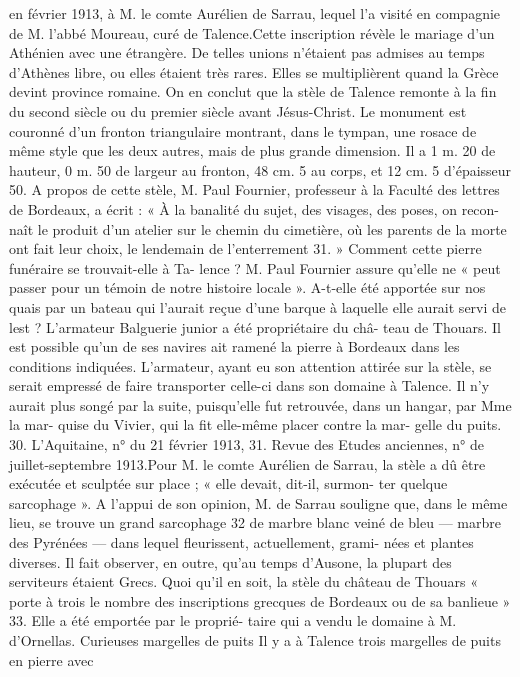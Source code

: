\documentclass[a4paper,11pt]{book}
\begin{document}
en février 1913, à M. le comte Aurélien de Sarrau, lequel l'a visité en
compagnie de M. l'abbé Moureau, curé de Talence.Cette inscription révèle le mariage d'un Athénien avec
une étrangère. De telles unions n'étaient pas admises au
temps d'Athènes libre, ou elles étaient très rares. Elles se
multiplièrent quand la Grèce devint province romaine. On
en conclut que la stèle de Talence remonte à la fin du
second siècle ou du premier siècle avant Jésus-Christ.
Le monument est couronné d'un fronton triangulaire
montrant, dans le tympan, une rosace de même style que
les deux autres, mais de plus grande dimension. Il a
1 m. 20 de hauteur, 0 m. 50 de largeur au fronton, 48 cm. 5
au corps, et 12 cm. 5 d'épaisseur 50.
A propos de cette stèle, M. Paul Fournier, professeur à
la Faculté des lettres de Bordeaux, a écrit :
« À la banalité du sujet, des visages, des poses, on recon-
naît le produit d'un atelier sur le chemin du cimetière, où
les parents de la morte ont fait leur choix, le lendemain
de l'enterrement 31. »
Comment cette pierre funéraire se trouvait-elle à Ta-
lence ? M. Paul Fournier assure qu'elle ne « peut passer
pour un témoin de notre histoire locale ». A-t-elle été
apportée sur nos quais par un bateau qui l'aurait reçue
d'une barque à laquelle elle aurait servi de lest ?
L'armateur Balguerie junior a été propriétaire du châ-
teau de Thouars. Il est possible qu'un de ses navires ait
ramené la pierre à Bordeaux dans les conditions indiquées.
L'armateur, ayant eu son attention attirée sur la stèle,
se serait empressé de faire transporter celle-ci dans son
domaine à Talence. Il n'y aurait plus songé par la suite,
puisqu'elle fut retrouvée, dans un hangar, par Mme la mar-
quise du Vivier, qui la fit elle-même placer contre la mar-
gelle du puits.
30. L'Aquitaine, n° du 21 février 1913,
31. Revue des Etudes anciennes, n° de juillet-septembre 1913.Pour M. le comte Aurélien de Sarrau, la stèle a dû être
exécutée et sculptée sur place ; « elle devait, dit-il, surmon-
ter quelque sarcophage ». A l'appui de son opinion, M. de
Sarrau souligne que, dans le même lieu, se trouve un grand
sarcophage 32 de marbre blanc veiné de bleu — marbre des
Pyrénées
— dans lequel fleurissent, actuellement, grami-
nées et plantes diverses. Il fait observer, en outre, qu'au
temps d'Ausone, la plupart des serviteurs étaient Grecs.
Quoi qu'il en soit, la stèle du château de Thouars « porte
à trois le nombre des inscriptions grecques de Bordeaux
ou de sa banlieue » 33. Elle a été emportée par le proprié-
taire qui a vendu le domaine à M. d'Ornellas.
Curieuses margelles de puits
Il y a à Talence trois margelles de puits en pierre avec
\end{document}
